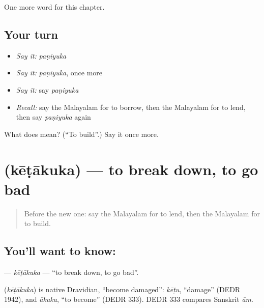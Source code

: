 \begin{grammarlens}[title={What you've built}]
One more word for this chapter.
\end{grammarlens}

\subsection*{Your turn}
\begin{itemize}
\raggedright
  \item \emph{Say it:} \emph{paṇiyuka}
  \item \emph{Say it:} \emph{paṇiyuka}, once more
  \item \emph{Say it:} say \emph{paṇiyuka}
  \item \emph{Recall:} say the Malayalam for to borrow, then the Malayalam for to lend, then say \emph{paṇiyuka} again
\end{itemize}

\begin{tcolorbox}[breakable,colback=teal!4,colframe=teal!35!black,title={Before you move on}]
What does  mean? (\textquotedblleft{}To build\textquotedblright{}.) Say it once more.
\end{tcolorbox}
\section[\texorpdfstring{\ml{കേടാകുക} (kēṭākuka)}{കേടാകുക (kēṭākuka)}]{ (kēṭākuka) — to break down, to go bad}

\label{lesson:ML-C271-ketakuka}



\begin{quote}
Before the new one: say the Malayalam for to lend, then the Malayalam for to build.
\end{quote}

\subsection*{You'll want to know: }
\textbf{} — \emph{kēṭākuka} — \textquotedblleft{}to break down, to go bad\textquotedblright{}.

\begin{cousinweb}
\textbf{} (\emph{kēṭākuka}) is native Dravidian, \textquotedblleft{}become damaged\textquotedblright{}: \emph{kēṭu}, \textquotedblleft{}damage\textquotedblright{} (DEDR 1942), and \emph{ākuka}, \textquotedblleft{}to become\textquotedblright{} (DEDR 333). DEDR 333 compares Sanskrit \emph{ām}.
\end{cousinweb}

